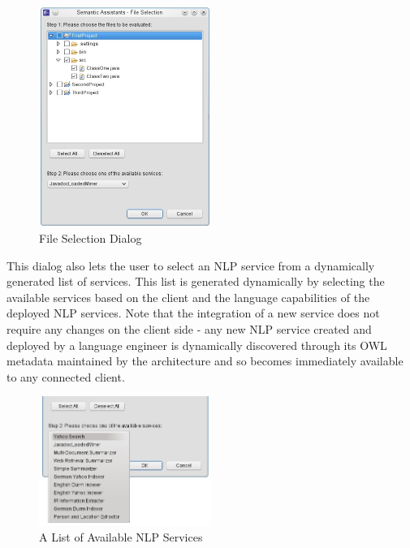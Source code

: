 \begin{figure}[htb]
\begin{center}
  \includegraphics[width=0.5\textwidth]{pictures/eclipse_fileSelection.jpg}
  \caption{File Selection Dialog}
  \label{fig:eclipse_fileSelection}
\end{center}
\end{figure}

This dialog also lets the user to select an NLP service from a dynamically
generated list of services. This list is generated dynamically by selecting the
available services based on the client and the language capabilities of the
deployed NLP services. Note that the integration of a new service does not
require any changes on the client side - any new NLP service created and
deployed by a language engineer is dynamically discovered through its OWL
metadata maintained by the architecture and so becomes immediately available to
any connected client.

\begin{figure}[htb]
\begin{center}
  \includegraphics[width=0.5\textwidth]{pictures/eclipse_services.jpg}
  \caption{A List of Available NLP Services}
  \label{fig:eclipse_services}
\end{center}
\end{figure}


